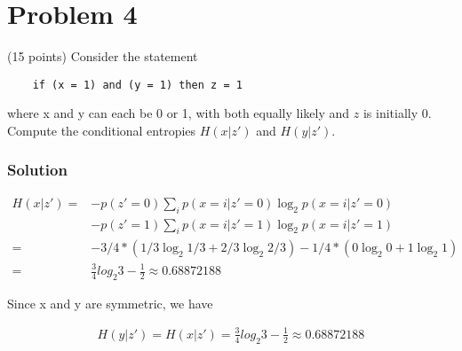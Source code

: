 \section*{Problem 4}
(15 points) Consider the statement

\begin{lstlisting}
    if (x = 1) and (y = 1) then z = 1 
\end{lstlisting}

where x and y can each be 0 or 1, with both equally likely and $z$ is initially 0. 
Compute the conditional entropies $H(x | z')$ and $H(y | z')$.

\subsubsection*{Solution}

\begin{align*}
    H(x | z')  = & -p(z'=0) \sum_i p(x=i | z'=0)\log_2 p(x=i | z'=0) \\ 
       & -p(z'=1) \sum_i p(x=i | z'=1)\log_2 p(x=i | z'=1)  \\
     = & -3/4 * (1/3\log_2 1/3 + 2/3\log_2 2/3) - 1/4 * (0\log_2 0 + 1\log_2 1)\\
     = & \frac{3}{4}log_2 3 - \frac{1}{2} \approx 0.68872188
\end{align*}

Since x and y are symmetric, we have 

\begin{align*}
    H(y | z') = H(x | z') = \frac{3}{4}log_2 3 - \frac{1}{2} \approx 0.68872188
\end{align*}